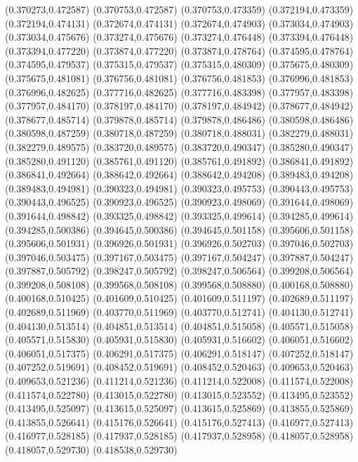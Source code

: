 (0.370273,0.472587)
(0.370753,0.472587)
(0.370753,0.473359)
(0.372194,0.473359)
(0.372194,0.474131)
(0.372674,0.474131)
(0.372674,0.474903)
(0.373034,0.474903)
(0.373034,0.475676)
(0.373274,0.475676)
(0.373274,0.476448)
(0.373394,0.476448)
(0.373394,0.477220)
(0.373874,0.477220)
(0.373874,0.478764)
(0.374595,0.478764)
(0.374595,0.479537)
(0.375315,0.479537)
(0.375315,0.480309)
(0.375675,0.480309)
(0.375675,0.481081)
(0.376756,0.481081)
(0.376756,0.481853)
(0.376996,0.481853)
(0.376996,0.482625)
(0.377716,0.482625)
(0.377716,0.483398)
(0.377957,0.483398)
(0.377957,0.484170)
(0.378197,0.484170)
(0.378197,0.484942)
(0.378677,0.484942)
(0.378677,0.485714)
(0.379878,0.485714)
(0.379878,0.486486)
(0.380598,0.486486)
(0.380598,0.487259)
(0.380718,0.487259)
(0.380718,0.488031)
(0.382279,0.488031)
(0.382279,0.489575)
(0.383720,0.489575)
(0.383720,0.490347)
(0.385280,0.490347)
(0.385280,0.491120)
(0.385761,0.491120)
(0.385761,0.491892)
(0.386841,0.491892)
(0.386841,0.492664)
(0.388642,0.492664)
(0.388642,0.494208)
(0.389483,0.494208)
(0.389483,0.494981)
(0.390323,0.494981)
(0.390323,0.495753)
(0.390443,0.495753)
(0.390443,0.496525)
(0.390923,0.496525)
(0.390923,0.498069)
(0.391644,0.498069)
(0.391644,0.498842)
(0.393325,0.498842)
(0.393325,0.499614)
(0.394285,0.499614)
(0.394285,0.500386)
(0.394645,0.500386)
(0.394645,0.501158)
(0.395606,0.501158)
(0.395606,0.501931)
(0.396926,0.501931)
(0.396926,0.502703)
(0.397046,0.502703)
(0.397046,0.503475)
(0.397167,0.503475)
(0.397167,0.504247)
(0.397887,0.504247)
(0.397887,0.505792)
(0.398247,0.505792)
(0.398247,0.506564)
(0.399208,0.506564)
(0.399208,0.508108)
(0.399568,0.508108)
(0.399568,0.508880)
(0.400168,0.508880)
(0.400168,0.510425)
(0.401609,0.510425)
(0.401609,0.511197)
(0.402689,0.511197)
(0.402689,0.511969)
(0.403770,0.511969)
(0.403770,0.512741)
(0.404130,0.512741)
(0.404130,0.513514)
(0.404851,0.513514)
(0.404851,0.515058)
(0.405571,0.515058)
(0.405571,0.515830)
(0.405931,0.515830)
(0.405931,0.516602)
(0.406051,0.516602)
(0.406051,0.517375)
(0.406291,0.517375)
(0.406291,0.518147)
(0.407252,0.518147)
(0.407252,0.519691)
(0.408452,0.519691)
(0.408452,0.520463)
(0.409653,0.520463)
(0.409653,0.521236)
(0.411214,0.521236)
(0.411214,0.522008)
(0.411574,0.522008)
(0.411574,0.522780)
(0.413015,0.522780)
(0.413015,0.523552)
(0.413495,0.523552)
(0.413495,0.525097)
(0.413615,0.525097)
(0.413615,0.525869)
(0.413855,0.525869)
(0.413855,0.526641)
(0.415176,0.526641)
(0.415176,0.527413)
(0.416977,0.527413)
(0.416977,0.528185)
(0.417937,0.528185)
(0.417937,0.528958)
(0.418057,0.528958)
(0.418057,0.529730)
(0.418538,0.529730)
